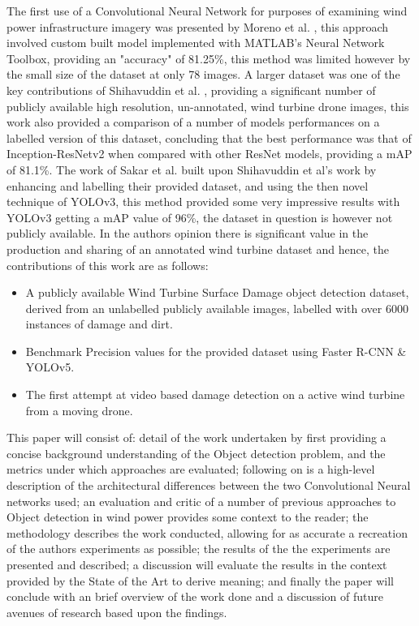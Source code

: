 \documentclass[conference]{IEEEtran}
\begin{document}
The first use of a Convolutional Neural Network for purposes of examining wind power infrastructure imagery was presented by Moreno et al. \cite{moreno2018new}, this approach involved custom built model implemented with MATLAB's Neural Network Toolbox, providing an "accuracy" of 81.25\%, this method was limited however by the small size of the dataset at only 78 images. A larger dataset was one of the key contributions of Shihavuddin et al. \cite{shihavuddin2019wind}, providing a significant number of publicly available high resolution, un-annotated, wind turbine drone images, this work also provided a comparison of a number of models performances on a labelled version of this dataset, concluding that the best performance was that of Inception-ResNetv2 when compared with other ResNet models, providing a mAP of 81.1\%. The work of Sakar et al. \cite{sarkar2021wind} built upon Shihavuddin et al's work by enhancing and labelling their provided dataset, and using the then novel technique of YOLOv3, this method provided some very impressive results with YOLOv3 getting a mAP value of 96\%, the dataset in question is however not publicly available. In the authors opinion there is significant value in the production and sharing of an annotated wind turbine dataset and hence, the contributions of this work are as follows:

\begin{itemize}
\item A publicly available Wind Turbine Surface Damage object detection dataset, derived from an unlabelled publicly available images, labelled with over 6000 instances of damage and dirt.
\item Benchmark Precision values for the provided dataset using Faster R-CNN \& YOLOv5.
\item The first attempt at video based damage detection on a active wind turbine from a moving drone.
\end{itemize}

This paper will consist of: detail of the work undertaken by first providing a concise background understanding of the Object detection problem, and the metrics under which approaches are evaluated; following on is a  high-level description of the architectural differences between the two Convolutional Neural networks used; an evaluation and critic of a number of previous approaches to Object detection in wind power provides some context to the reader; the methodology describes the work conducted, allowing for as accurate a recreation of the authors experiments as possible; the results of the the experiments are presented and described; a discussion will evaluate the results in the context provided by the State of the Art to derive meaning; and finally the paper will conclude with an brief overview of the work done and a discussion of future avenues of research based upon the findings.
\end{document}
